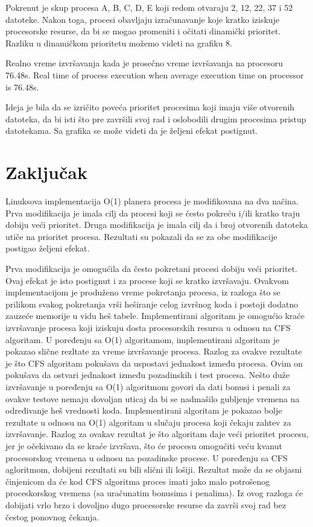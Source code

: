 Pokrenut je skup procesa A, B, C, D, E koji redom otvaraju 2, 12, 22, 37 i 52 datoteke. Nakon toga, procesi obavljaju izračunavanje koje kratko iziskuje procesorske resurse, da bi se mogao promeniti i očitati dinamički prioritet. Razliku u dinamičkom prioritetu možemo videti na grafiku 8.

    {Realno vreme izvršavanja kada je prosečno vreme izvršavanja na procesoru 76.48s.}
    {Real time of process execution when average execution time on processor is 76.48s.}

Ideja je bila da se izričito poveća prioritet procesima koji imaju više otvorenih datoteka, da bi isti što pre završili svoj rad i oslobodili drugim procesima pristup datotekama. Sa grafika se može videti da je željeni efekat postignut.


\section{Zaključak}

Linuksova implementacija O(1) planera procesa je modifikovana na dva načina. Prva modifikacija je imala cilj da procesi koji se često pokreću i/ili kratko traju dobiju veći prioritet. Druga modifikacija je imala cilj da i broj otvorenih datoteka utiče na prioritet procesa. Rezultati su pokazali da se za obe modifikacije postigao željeni efekat.

Prva modifikacija je omogućila da često pokretani procesi dobiju veći prioritet. Ovaj efekat je isto postignut i za procese koji se kratko izvršavaju. Ovakvom implementacijom je produženo vreme pokretanja procesa, iz razloga što se prilikom svakog pokretanja vrši heširanje celog izvršnog koda i postoji dodatno zauzeće memorije u vidu heš tabele. Implementirani algoritam je omogućio kraće izvršavanje procesa koji iziskuju dosta procesorskih resursa u odnosu na CFS algoritam. U poređenju sa O(1) algoritamom, implementirani algoritam je pokazao slične rezltate za vreme izvršavanje procesa. Razlog za ovakve rezultate je što CFS algoritam pokušava da uspostavi jednakost između procesa. Ovim on pokušava da ostvari jednakost između pozadinskih i test procesa. Nešto duže izvršavanje u poređenju sa O(1) algoritmom govori da dati bonusi i penali za ovakve testove nemaju dovoljan uticaj da bi se nadmašilo gubljenje vremena na određivanje heš vrednosti koda. Implementirani algoritam je pokazao bolje rezultate u odnosu na O(1) algoritam u slučaju procesa koji čekaju zahtev za izvršavanje. Razlog za ovakav rezultat je što algoritam daje veći prioritet procesu, jer je očekivano da se kraće izvršava, što će procesu omogućiti veću kvanut procesorskog vremena u odnosu na pozadinske procese. U poređenju sa CFS  agloritmom, dobijeni rezultati su bili slični ili lošiji. Rezultat može da se objasni činjenicom da će kod CFS algoritma proces imati jako malo potrošenog proceskorskog vremena (sa uračunatim bonusima i penalima). Iz ovog razloga će dobijati vrlo brzo i dovoljno dugo procesorske resurse da završi svoj rad bez čestog ponovnog čekanja.

